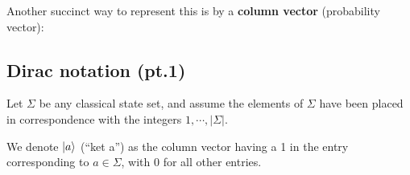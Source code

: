 \newpage

Another succinct way to represent this is by a \textbf{column vector} (probability vector):


\subsection{Dirac notation (pt.1)}
Let $\Sigma$ be any classical state set, and assume the elements of $\Sigma$ have been placed in correspondence with the integers $1,\cdots,|\Sigma|$.

\bigbreak

We denote $\ket{a}$ (``ket a'') as the column vector having a 1 in the entry corresponding to $a\in\Sigma$, with 0 for all other entries.


